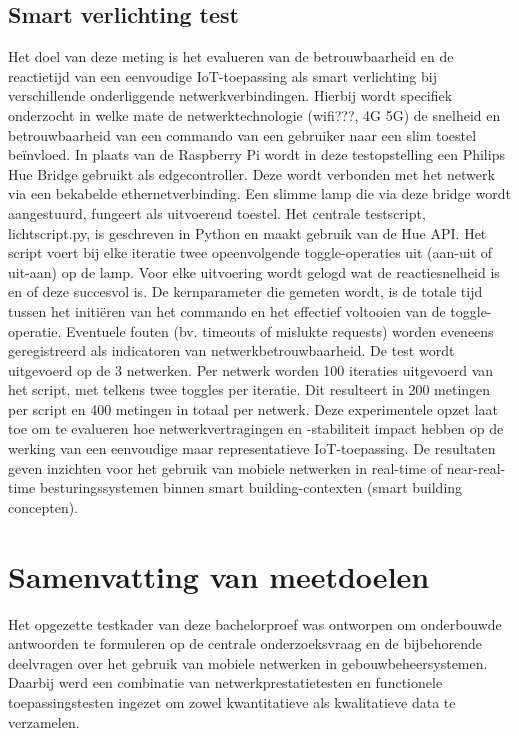 \subsection{Smart verlichting test}
Het doel van deze meting is het evalueren van de betrouwbaarheid en de reactietijd van een eenvoudige IoT-toepassing als smart verlichting bij verschillende onderliggende netwerkverbindingen.
Hierbij wordt specifiek onderzocht in welke mate de netwerktechnologie (wifi???, 4G 5G) de snelheid en betrouwbaarheid van een commando van een gebruiker naar een slim toestel beïnvloed.
In plaats van de Raspberry Pi wordt in deze testopstelling een Philips Hue Bridge gebruikt als edgecontroller. Deze wordt verbonden met het netwerk via een bekabelde ethernetverbinding. Een slimme lamp die via deze bridge wordt aangestuurd, fungeert als uitvoerend toestel.
Het centrale testscript, lichtscript.py, is geschreven in Python en maakt gebruik van de Hue API. Het script voert bij elke iteratie twee opeenvolgende toggle-operaties uit (aan-uit of uit-aan) op de lamp. Voor elke uitvoering wordt gelogd wat de reactiesnelheid is en of deze succesvol is.
De kernparameter die gemeten wordt, is de totale tijd tussen het initiëren van het commando en het effectief voltooien van de toggle-operatie. Eventuele fouten (bv. timeouts of mislukte requests) worden eveneens geregistreerd als indicatoren van netwerkbetrouwbaarheid.
De test wordt uitgevoerd op de 3 netwerken. Per netwerk worden 100 iteraties uitgevoerd van het script, met telkens twee toggles per iteratie. Dit resulteert in 200 metingen per script en 400 metingen in totaal per netwerk.
Deze experimentele opzet laat toe om te evalueren hoe netwerkvertragingen en -stabiliteit impact hebben op de werking van een eenvoudige maar representatieve IoT-toepassing. De resultaten geven inzichten voor het gebruik van mobiele netwerken in real-time of near-real-time besturingssystemen binnen smart building-contexten (smart building concepten).



\section{Samenvatting van meetdoelen}

Het opgezette testkader van deze bachelorproef was ontworpen om onderbouwde antwoorden te formuleren op de centrale onderzoeksvraag en de bijbehorende deelvragen over het gebruik van mobiele netwerken in gebouwbeheersystemen. Daarbij werd een combinatie van netwerkprestatietesten en functionele toepassingstesten ingezet om zowel kwantitatieve als kwalitatieve data te verzamelen.

